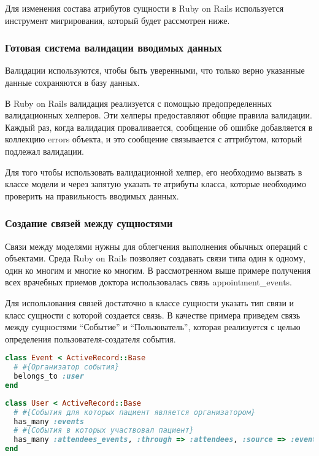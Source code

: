 Для изменения состава атрибутов сущности в Ruby on Rails используется инструмент
мигрирования, который будет рассмотрен ниже.

\subsubsection{Готовая система валидации вводимых данных}
Валидации используются, чтобы быть уверенными, что только верно указанные данные
сохраняются в базу данных.

В Ruby on Rails валидация реализуется с помощью предопределенных валидационных
хелперов. Эти хелперы предоставляют общие правила валидации. Каждый раз, когда
валидация проваливается, сообщение об ошибке добавляется в коллекцию errors
объекта, и это сообщение связывается с аттрибутом, который подлежал валидации.

Для того чтобы использовать валидационной хелпер, его необходимо вызвать в
классе модели и через запятую указать те атрибуты класса, которые необходимо
проверить на правильность вводимых данных.

\subsubsection{Создание связей между сущностями}
Связи между моделями нужны для облегчения выполнения обычных операций с
объектами. Среда Ruby on Rails позволяет создавать связи типа один к одному,
один ко многим и многие ко многим. В рассмотренном выше примере получения всех
врачебных приемов доктора использовалась связь appointment\_events.

Для использования связей достаточно в классе сущности указать тип связи и класс
сущности с которой создается связь. В качестве примера приведем связь между
сущностями “Событие” и “Пользователь”, которая реализуется с целью определения
пользователя-создателя события.

\begin{lstlisting}[language=Ruby,caption=Связь на
стороне события,label={lst:ar_event_links}] 
class Event < ActiveRecord::Base
  # #{Организатор события} 
  belongs_to :user
end  
\end{lstlisting}

\begin{lstlisting}[language=Ruby,caption=Связь на
стороне события,label={lst:ar_user_links}]
class User < ActiveRecord::Base  
  # #{События для которых пациент является организатором}
  has_many :events
  # #{События в которых участвовал пациент}
  has_many :attendees_events, :through => :attendees, :source => :event
end  
\end{lstlisting}


